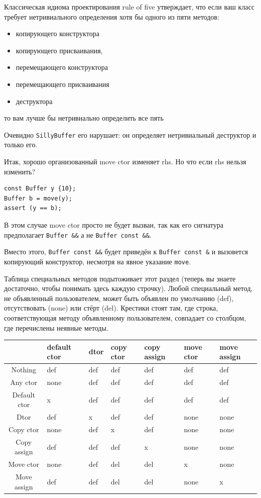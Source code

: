 \documentclass[a4paper,12pt,oneside]{book}
\begin{document}
Классическая идиома проектирования rule of five утверждает, что если ваш класс требует нетривиального определения хотя бы одного из пяти методов:

\begin{itemize} 
\item копирующего конструктора
\item копирующего присваивания,
\item перемещающего конструктора
\item перемещающего присваивания 
\item деструктора
\end{itemize} 

то вам лучше бы нетривиально определить все пять

Очевидно \lstinline!SillyBuffer! его нарушает: он определяет нетривиальный деструктор и только его.

Итак, хорошо организованный move ctor изменяет rhs. Но что если rhs нельзя изменить?

\begin{lstlisting}
const Buffer y {10};
Buffer b = move(y);
assert (y == b); 
\end{lstlisting}

В этом случае move ctor просто не будет вызван, так как его сигнатура предполагает \lstinline!Buffer &&! а не \lstinline!Buffer const &&!.

Вместо этого, \lstinline!Buffer const &&! будет приведён к \lstinline!Buffer const &! и вызовется копирующий конструктор, несмотря на явное указание \lstinline!move!.

Таблица специальных методов подытоживает этот раздел (теперь вы знаете достаточно, чтобы понимать здесь каждую строчку). Любой специальный метод, не объявленный пользователем, может быть объявлен по умолчанию (def), отсутствовать (none) или стёрт (del). Крестики стоят там, где строка, соответствующая методу объявленному пользователем, совпадает со столбцом, где перечислены неявные методы.

\begin{center}
  \begin{tabular}{ | c | p{1cm} | p{1cm} | p{1cm} | p{1cm} | p{1cm} | p{1cm} | }
    \hline
     & default ctor & dtor & copy ctor & copy assign & move ctor & move assign \\ \hline \hline
    Nothing & def & def & def & def & def & def \\ \hline
    Any ctor & none & def & def & def & def & def \\ \hline
    Default ctor & x & def & def & def & def & def \\ \hline
    Dtor & def & x & def & def & none & none \\ \hline
    Copy ctor & none & def & x & def & none & none \\ \hline
    Copy assign & def & def & def & x & none & none \\ \hline
    Move ctor & none & def & del & del & x & none \\ \hline
    Move assign & def & def & del & del & none & x \\ \hline
  \end{tabular}
\end{center}
\end{document}
